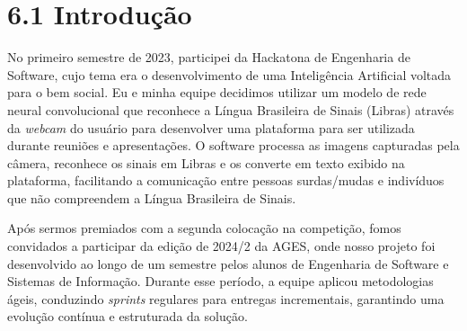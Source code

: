 \hypertarget{__RefHeading___Toc4802_37900007991}{}
\hypertarget{_Toc456271431}{}

\section*{6.1 Introdução}
\label{cliente-hoortech:text-h-0024}

\originaltab{}No primeiro semestre de 2023, participei da Hackatona de Engenharia de Software, cujo tema era o desenvolvimento de uma Inteligência Artificial voltada para o bem social. Eu e minha equipe decidimos utilizar um modelo de rede neural convolucional que reconhece a Língua Brasileira de Sinais (Libras) através da \textit{webcam} do usuário para desenvolver uma plataforma para ser utilizada durante reuniões e apresentações. O software processa as imagens capturadas pela câmera, reconhece os sinais em Libras e os converte em texto exibido na plataforma, facilitando a comunicação entre pessoas surdas/mudas e indivíduos que não compreendem a Língua Brasileira de Sinais.\par

\originaltab{}Após sermos premiados com a segunda colocação na competição, fomos convidados a participar da edição de 2024/2 da AGES, onde nosso projeto foi desenvolvido ao longo de um semestre pelos alunos de Engenharia de Software e Sistemas de Informação. Durante esse período, a equipe aplicou metodologias ágeis, conduzindo \textit{sprints} regulares para entregas incrementais, garantindo uma evolução contínua e estruturada da solução.\par


